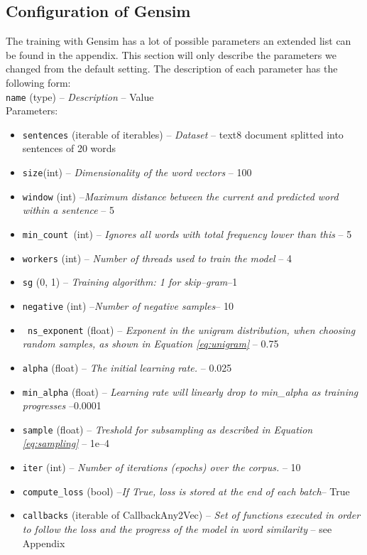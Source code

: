 \subsection{Configuration of Gensim}
The training with Gensim has a lot of possible parameters an extended list can be found in the appendix. This section will only describe the parameters we changed from the default setting. The description of each parameter has the following form: \\
\texttt{name} (type) -- \textit{Description} -- Value\\
Parameters:
\begin{itemize}
\item \texttt{sentences} (iterable of iterables) -- \textit{Dataset} -- text8 document splitted into sentences of 20 words
\item \texttt{size}(int) – \textit{Dimensionality of the word vectors } -- 100
\item \texttt{window} (int) --\textit {Maximum distance between the current and predicted word within a sentence }-- 5
\item \texttt{min\_count }(int) --\textit{ Ignores all words with total frequency lower than this }-- 5
\item \texttt{workers} (int) -- \textit{ Number of threads used to train the model} -- 4
\item \texttt{sg} ({0, 1}) --\textit{ Training algorithm: 1 for skip--gram}--1
\item \texttt{negative} (int) --\textit{Number of negative samples}-- 10
\item \texttt{ ns\_exponent} (float) --\textit{ Exponent in the unigram distribution, when choosing random samples, as shown in Equation \ref{eq:unigram} }-- 0.75
\item \texttt{alpha} (float) --\textit{ The initial learning rate. }-- 0.025
\item \texttt{min\_alpha} (float) --\textit{ Learning rate will linearly drop to min\_alpha as training progresses }--0.0001
\item \texttt{sample} (float) --\textit{ Treshold for subsampling as described in Equation \ref{eq:sampling}} -- 1e--4
\item \texttt{iter} (int) --\textit{ Number of iterations (epochs) over the corpus. }-- 10
\
\item \texttt{compute\_loss} (bool) --\textit{If True, loss is stored at the end of each batch}-- True
\item \texttt{callbacks} (iterable of CallbackAny2Vec) --\textit{ Set of functions executed in order to follow the loss and the progress of the model in word similarity }-- see Appendix
\end{itemize}

